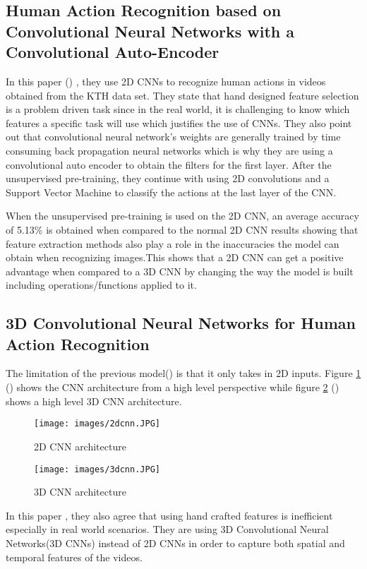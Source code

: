\subsection{Human Action Recognition based on Convolutional Neural Networks
with a Convolutional Auto-Encoder}
 \vspace{0.1in}

\par
In this paper (\cite{geng2015human}) , they use 2D CNNs to recognize human actions in videos obtained from the KTH data set. They state that hand designed feature selection is a problem driven task since in the real world, it is challenging to know which features a specific task will use which justifies the use of CNNs. They also point out that convolutional neural network's weights are generally trained by time consuming back propagation neural networks which is why they are using a convolutional auto encoder to obtain the filters for the first layer. After the unsupervised pre-training, they continue with using 2D convolutions and a Support Vector Machine to classify the actions at the last layer of the CNN.\vspace{0.1in} 

When the unsupervised pre-training is used on the 2D CNN, an average accuracy of 5.13\% is obtained when compared to the normal 2D CNN results showing that feature extraction methods also play a role in the inaccuracies the model can obtain when recognizing images.This shows that a 2D CNN can get a positive advantage when compared to a 3D CNN by changing the way the model is built including operations/functions applied to it.

\par

\subsection{3D Convolutional Neural Networks for Human Action Recognition}
 \vspace{0.1in}
 \par
The limitation of the previous model(\cite{geng2015human}) is that it only takes in 2D inputs. Figure \ref{fig:2D} (\cite{geng2015human}) shows the CNN architecture from a high level perspective while figure \ref{fig:3D} (\cite{ji20133d}) shows a high level 3D CNN architecture.
\begin{figure}[h!]
	\texttt{[image: images/2dcnn.JPG]} 
	\caption{2D CNN architecture}
	\label{fig:2D}
\end{figure}	
 \par
\vspace{0.4in}
\begin{figure}[h!]
\texttt{[image: images/3dcnn.JPG]} 
\caption{3D CNN architecture}
\label{fig:3D}
\end{figure}
 \par
\vspace{0.4in}
In this paper \cite{ji20133d}, they also agree that using hand crafted features is inefficient especially in real world scenarios. They are using 3D Convolutional Neural Networks(3D CNNs) instead of 2D CNNs in order to capture both spatial and temporal features of the videos. \vspace{0.1in} 

